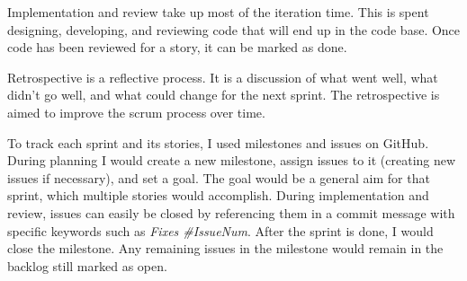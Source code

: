 Implementation and review take up most of the iteration time. This is spent designing, developing, and reviewing code that will end up in the code base. Once code has been reviewed for a story, it can be marked as done. 

Retrospective is a reflective process. It is a discussion of what went well, what didn't go well, and what could change for the next sprint. The retrospective is aimed to improve the scrum process over time.

To track each sprint and its stories, I used milestones and issues on GitHub\cite{GitHubMilestones}. During planning I would create a new milestone, assign issues to it (creating new issues if necessary), and set a goal. The goal would be a general aim for that sprint, which multiple stories would accomplish. During implementation and review, issues can easily be closed by referencing them in a commit message with specific keywords such as \textit{Fixes \#IssueNum}\cite{GitHubCloseIssueCommit}. After the sprint is done, I would close the milestone. Any remaining issues in the milestone would remain in the backlog still marked as open.
























